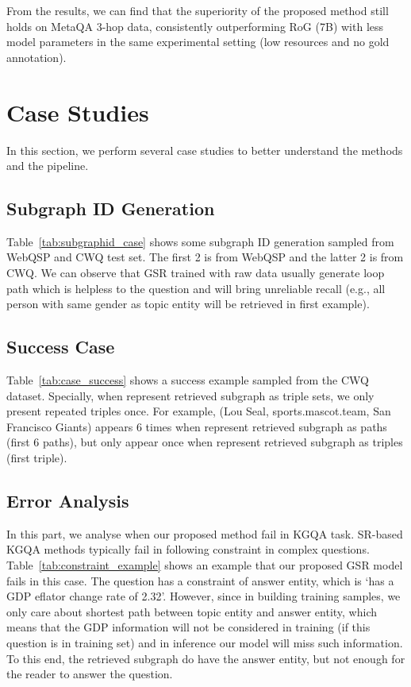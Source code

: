 \documentclass[11pt]{article}
\begin{document}
From the results, we can find that the superiority of the proposed method still holds on MetaQA 3-hop data, consistently outperforming RoG (7B) with less model parameters in the same experimental setting (low resources and no gold annotation). 

\section{Case Studies}
\label{app:case_studies}

In this section, we perform several case studies to better understand the methods and the pipeline.

\subsection{Subgraph ID Generation}
Table~\ref{tab:subgraphid_case} shows some subgraph ID generation sampled from WebQSP and CWQ test set. The first 2 is from WebQSP and the latter 2 is from CWQ. We can observe that GSR trained with raw data usually generate loop path which is helpless to the question and will bring unreliable recall (e.g., all person with same gender as topic entity will be retrieved in first example).


\subsection{Success Case}
Table~\ref{tab:case_success} shows a success example sampled from the CWQ dataset. Specially, when represent retrieved subgraph as triple sets, we only present repeated triples once. For example, (Lou Seal, sports.mascot.team, San Francisco Giants) appears 6 times when represent retrieved subgraph as paths (first 6 paths), but only appear once when represent retrieved subgraph as triples (first triple).

\subsection{Error Analysis}
In this part, we analyse when our proposed method fail in KGQA task. 
\label{app:limitation_constraint}
SR-based KGQA methods typically fail in following constraint in complex questions. Table~\ref{tab:constraint_example} shows an example that our proposed GSR model fails in this case. The question has a constraint of answer entity, which is `has a GDP eflator change rate of 2.32'. However, since in building training samples, we only care about shortest path between topic entity and answer entity, which means that the GDP information will not be considered in training (if this question is in training set) and in inference our model will miss such information. To this end, the retrieved subgraph do have the answer entity, but not enough for the reader to answer the question. 
\end{document}
